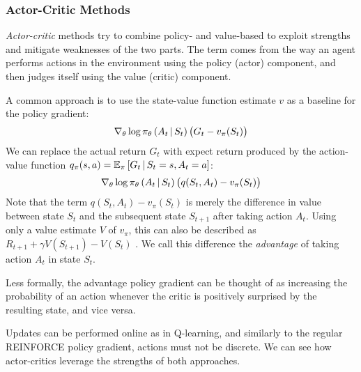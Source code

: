 \subsubsection{Actor-Critic Methods}
\textit{Actor-critic} methods \cite{bible} try to combine policy- and value-based to exploit strengths and mitigate weaknesses of the two parts. The term comes from the way an agent performs actions in the environment using the policy (actor) component, and then judges itself using the value (critic) component.

A common approach is to use the state-value function estimate $v$ as a baseline for the policy gradient:
\begin{equation*}
    \nabla_\theta \log \pi_\theta\left(A_t \,\middle|\, S_t\right) \left(G_t - v_\pi(S_t)\right)
\end{equation*}
We can replace the actual return $G_t$ with expect return produced by the action-value function $q_\pi(s, a) = \mathbb{E}_\pi \left[G_t \,\middle|\, S_t = s, A_t = a\right]$:
\begin{equation*}
    \nabla_\theta \log \pi_\theta\left(A_t \,\middle|\, S_t\right) \left(q(S_t, A_t) - v_\pi(S_t)\right)
\end{equation*}
Note that the term $q(S_t, A_t) - v_\pi(S_t)$ is merely the difference in value between state $S_t$ and the subsequent state $S_{t+1}$ after taking action $A_t$. Using only a value estimate $V$ of $v_\pi$, this can also be described as $R_{t+1} + \gamma V(S_{t+1}) - V(S_t)$ \cite{a3c}. We call this difference the \textit{advantage} of taking action $A_t$ in state $S_t$.

Less formally, the advantage policy gradient can be thought of as increasing the probability of an action whenever the critic is positively surprised by the resulting state, and vice versa.

Updates can be performed online as in Q-learning, and similarly to the regular REINFORCE policy gradient, actions must not be discrete. We can see how actor-critics leverage the strengths of both approaches.